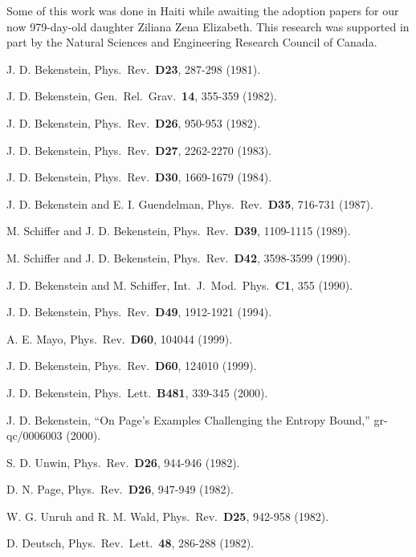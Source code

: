 \documentclass[a4paper,12pt]{article}
\begin{document}
	Some of this work was done in Haiti
while awaiting the adoption papers
for our now 979-day-old daughter
Ziliana Zena Elizabeth.
This research was supported in part by
the Natural Sciences and Engineering Research
Council of Canada.

\baselineskip 4pt

\begin{thebibliography}{99}

J. D. Bekenstein,
Phys.\ Rev.\ {\bf D23}, 287-298 (1981).

J. D. Bekenstein,
Gen.\ Rel.\ Grav.\ {\bf 14}, 355-359 (1982).

J. D. Bekenstein,
Phys.\ Rev.\ {\bf D26}, 950-953 (1982).

J. D. Bekenstein,
Phys.\ Rev.\ {\bf D27}, 2262-2270 (1983).

J. D. Bekenstein,
Phys.\ Rev.\ {\bf D30}, 1669-1679 (1984).

J. D. Bekenstein and E. I. Guendelman,
Phys.\ Rev.\ {\bf D35}, 716-731 (1987).

M. Schiffer and J. D. Bekenstein,
Phys.\ Rev.\ {\bf D39}, 1109-1115 (1989).

M. Schiffer and J. D. Bekenstein,
Phys.\ Rev.\ {\bf D42}, 3598-3599 (1990).

J. D. Bekenstein and M. Schiffer,
Int.\ J.\ Mod.\ Phys.\ {\bf C1}, 355 (1990).

J. D. Bekenstein,
Phys.\ Rev.\ {\bf D49}, 1912-1921 (1994).

A. E. Mayo,
Phys.\ Rev.\ {\bf D60}, 104044 (1999).

J. D. Bekenstein,
Phys.\ Rev.\ {\bf D60}, 124010 (1999).

J. D. Bekenstein,
Phys.\ Lett.\ {\bf B481}, 339-345 (2000).

J. D. Bekenstein,
``On Page's Examples Challenging the Entropy Bound,''
gr-qc/0006003 (2000).

S. D. Unwin,
Phys.\ Rev.\ {\bf D26}, 944-946 (1982).

D. N. Page,
Phys.\ Rev.\ {\bf D26}, 947-949 (1982).

W. G. Unruh and R. M. Wald,
Phys.\ Rev.\ {\bf D25}, 942-958 (1982).

D. Deutsch,
Phys.\ Rev.\ Lett.\ {\bf 48}, 286-288 (1982).


\end{thebibliography}
\end{document}
